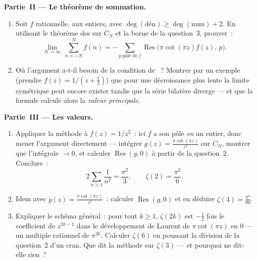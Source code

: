\begin{problem}
\medskip
\noindent\textbf{Partie~II --- Le théorème de sommation.}
\begin{enumerate}[resume]
  \item Soit $f$ rationnelle,  aux entiers, avec
        $\deg(\text{dén}) \geq \deg(\text{num}) + 2$. En
        utilisant le théorème des  sur $C_N$ et la
        borne de la question~3, prouver~:
        \[
        \lim_{N\to\infty}\ \sum_{n = -N}^{N} f(n)
        = -\sum_{p\ \text{pôle de}\ f}
        \operatorname{Res}\bigl(\pi\cot(\pi z)f(z),\,p\bigr).
        \]
  \item Où l'argument a-t-il besoin de la condition de
        ~? Montrer par un exemple (prendre $f(z) =
        1/(z + \frac12)$) que pour une décroissance plus
        lente la limite symétrique peut encore exister
        tandis que la série bilatère diverge --- et que la
        formule calcule alors la \emph{valeur principale}.
\end{enumerate}

\medskip
\noindent\textbf{Partie~III --- Les valeurs.}
\begin{enumerate}[resume]
  \item Appliquer la méthode à $f(z) = 1/z^2$~: ici $f$ a
        son pôle \emph{en} un entier, donc mener l'argument
        directement --- intégrer $g(z) =
        \frac{\pi\cot(\pi z)}{z^2}$ sur $C_N$, montrer que
        l'intégrale $\to 0$, et calculer
        $\operatorname{Res}(g, 0)$ à partir de la
        question~2. Conclure~:
        \[
        2\sum_{n\geq1}\frac1{n^2} = \frac{\pi^2}{3},
        \qquad \zeta(2) = \frac{\pi^2}6 .
        \]
  \item Idem avec $g(z) = \frac{\pi\cot(\pi z)}{z^4}$~:
        calculer $\operatorname{Res}(g, 0)$ et en déduire
        $\zeta(4) = \frac{\pi^4}{90}$.
  \item Expliquer le schéma général~: pour tout $k \geq 1$,
        $\zeta(2k)$ est $-\frac12$ fois le coefficient de
        $z^{2k-1}$ dans le développement de Laurent de
        $\pi\cot(\pi z)$ en $0$ --- un multiple rationnel de
        $\pi^{2k}$. Calculer $\zeta(6)$ en poussant la
        division de la question~2 d'un cran. Que dit la
        méthode sur $\zeta(3)$ --- et pourquoi ne dit-elle
        rien~?
\end{enumerate}


\end{problem}
